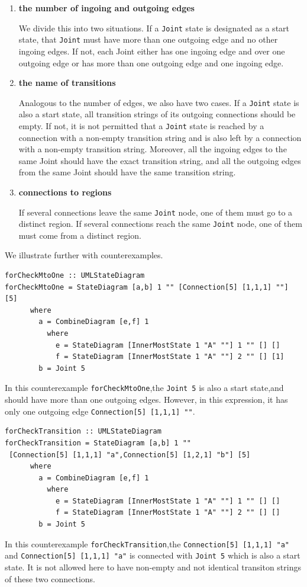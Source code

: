 \begin{enumerate}
\item \textbf{the number of ingoing and outgoing edges }

We divide this into two situations.
If a \verb|Joint| state is designated as a start state, that \verb|Joint| must have more than one outgoing edge and no other ingoing edges. 
If not, each Joint either has one ingoing edge and over one outgoing edge or has more than one outgoing edge and one ingoing edge.

\item  \textbf{the name of transitions}

 Analogous to the number of edges, we also have two cases. 
 If a \verb|Joint| state is also a start state, all transition strings of its outgoing connections should be empty.
 If not, it is not permitted that a \verb|Joint| state is reached by a connection with a non-empty transition string and is also left by a connection with a non-empty transition string.
 Moreover, all the ingoing edges to the same Joint should have the exact transition string, and all the outgoing edges from the same Joint should have the same transition string.
\item \textbf{connections to regions }

If several connections leave the same \verb|Joint| node, one of them must go to a distinct region.
If several connections reach the same \verb|Joint| node, one of them must come from a distinct region.
\end{enumerate}

We illustrate further with counterexamples.
\begin{verbatim}
forCheckMtoOne :: UMLStateDiagram
forCheckMtoOne = StateDiagram [a,b] 1 "" [Connection[5] [1,1,1] ""] [5]
      where
        a = CombineDiagram [e,f] 1
          where 
            e = StateDiagram [InnerMostState 1 "A" ""] 1 "" [] []
            f = StateDiagram [InnerMostState 1 "A" ""] 2 "" [] [1]
        b = Joint 5
\end{verbatim}
In this counterexample \verb|forCheckMtoOne|,the \verb|Joint 5| is also a start state,and should have more than one outgoing edges. However, in this expression, it has only one outgoing edge \verb|Connection[5] [1,1,1] ""|.

\begin{verbatim}
forCheckTransition :: UMLStateDiagram
forCheckTransition = StateDiagram [a,b] 1 "" 
 [Connection[5] [1,1,1] "a",Connection[5] [1,2,1] "b"] [5]
      where
        a = CombineDiagram [e,f] 1
          where 
            e = StateDiagram [InnerMostState 1 "A" ""] 1 "" [] []
            f = StateDiagram [InnerMostState 1 "A" ""] 2 "" [] []
        b = Joint 5
\end{verbatim}
In this counterexample \verb|forCheckTransition|,the \verb|Connection[5] [1,1,1] "a"| and \verb|Connection[5] [1,1,1] "a"| is connected with \verb|Joint 5| which is also a start state.
It is not allowed here to have non-empty and not identical transiton strings of these two connections.

